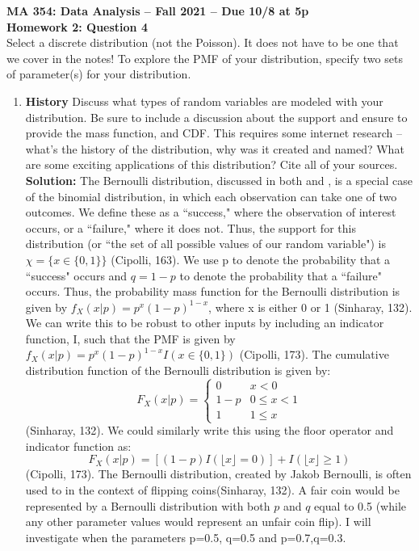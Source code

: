 \documentclass{article}\usepackage[]{graphicx}\usepackage[]{color}
\begin{document}
\noindent \textbf{MA 354: Data Analysis -- Fall 2021 -- Due 10/8 at 5p}\\%
\noindent \textbf{Homework 2: Question 4}\vspace{1em}\\
Select a discrete distribution (not the Poisson). It does not 
  have to be one that we cover in the notes! To explore the PMF of your distribution, 
  specify two sets of parameter(s) for your distribution.
  \begin{enumerate}
  \item \textbf{History} Discuss what types of random variables are modeled with 
  your distribution. Be sure to include a discussion about the support and ensure
  to provide the mass function, and CDF. This requires some internet research -- 
  what's the history of the distribution, why was it created and named? What are
  some exciting applications of this distribution? Cite all of your sources.\\
  
  \textbf{Solution:}
  The Bernoulli distribution, discussed in both \cite{chap6} and \cite{Bern}, is a special case of the binomial distribution, in which each observation can take one of two outcomes.  We define these as a ``success," where the observation of interest occurs, or a ``failure," where it does not.  Thus, the support for this distribution (or ``the set of all possible values of our random variable") is $\chi = \{x \in \{0,1\}\}$ (Cipolli, 163).  We use p to denote the probability that a ``success" occurs and $q=1-p$ to denote the probability that a ``failure" occurs. Thus, the probability mass function for the Bernoulli distribution is given by $f_X(x|p)=p^x(1-p)^{1-x}$, where x is either 0 or 1 (Sinharay, 132).  We can write this to be robust to other inputs by including an indicator function, I, such that the PMF is given by $f_X(x|p)=p^x(1-p)^{1-x}I(x\in\{0,1\})$ (Cipolli, 173). The cumulative distribution function of the Bernoulli distribution is given by:
$$ F_X(x|p) = 
\begin{cases} 
      0 & x < 0 \\
      1-p & 0\leq x <1 \\
      1 & 1\leq x 
   \end{cases}
$$
(Sinharay, 132).  We could similarly write this using the floor operator and indicator function as:
$$F_X(x|p) = [(1-p)I(\lfloor x \rfloor = 0)]+I(\lfloor x \rfloor \geq 1)
$$
(Cipolli, 173). The Bernoulli distribution, created by Jakob Bernoulli, is often used to in the context of flipping coins(Sinharay, 132).  A fair coin would be represented by a Bernoulli distribution with both $p$ and $q$ equal to 0.5 (while any other parameter values would represent an unfair coin flip).  I will investigate when the parameters p=0.5, q=0.5 and p=0.7,q=0.3.


\end{enumerate}
\end{document}
